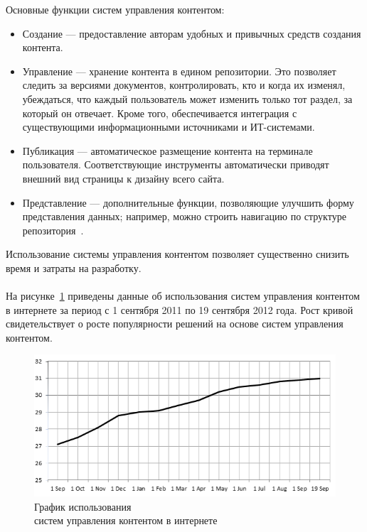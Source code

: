Основные функции систем управления контентом:
\begin{itemize}
\item
  Создание --- предоставление авторам удобных и привычных средств создания контента.

\item
  Управление --- хранение контента в едином репозитории. 
  Это позволяет следить за версиями документов, контролировать, кто и когда их изменял, убеждаться,
  что каждый пользователь может изменить только тот раздел, за который он отвечает.
  Кроме того, обеспечивается интеграция с существующими информационными источниками и ИТ-системами.

\item
  Публикация --- автоматическое размещение контента на терминале пользователя. 
  Соответствующие инструменты автоматически приводят внешний вид страницы к дизайну всего сайта.

\item
  Представление --- дополнительные функции, позволяющие улучшить форму представления данных; например,
  можно строить навигацию по структуре репозитория~\cite{osp_cms_functions}.
\end{itemize}

Использование системы управления контентом позволяет существенно снизить время и затраты на разработку.

\paragraph{}
На рисунке~\ref{fig:cms_usage_dynamic} приведены данные об использования систем управления контентом в интернете за период
с 1 сентября 2011 по 19 сентября 2012 года. Рост кривой свидетельствует о росте популярности решений на 
основе систем управления контентом.

\begin{figure}[h]
  \centering
  \includegraphics[width=150mm]{pic/dynamic_cms_usage.png}
  \caption{График использования \\ систем управления контентом в интернете}
  \label{fig:cms_usage_dynamic}
\end{figure}

